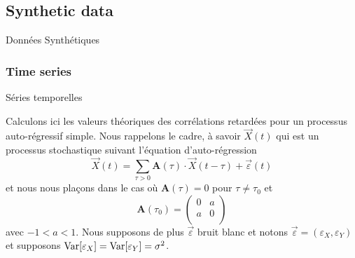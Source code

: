 








\subsection{Synthetic data}{Données Synthétiques}


\subsubsection{Time series}{Séries temporelles}


Calculons ici les valeurs théoriques des corrélations retardées pour un processus auto-régressif simple. Nous rappelons le cadre, à savoir $\vec{X}(t)$ qui est un processus stochastique suivant l'équation d'auto-régression
\[
\vec{X}(t) = \sum_{\tau > 0} \mathbf{A}(\tau) \cdot \vec{X}(t - \tau ) + \vec{\varepsilon}(t)
\]
et nous nous plaçons dans le cas où $\mathbf{A}(\tau) = 0$ pour $\tau \neq \tau_0$ et 
\[
\mathbf{A}(\tau_0) = \left( {\begin{array}{cc} 0 & a \\ a & 0 \\ \end{array}} \right)\]
avec $-1<a<1$. Nous supposons de plus $\vec{\varepsilon}$ bruit blanc et notons $\vec{\varepsilon} = (\varepsilon_X,\varepsilon_Y)$ et supposons $\operatorname{Var}\!\left[\varepsilon_X\right] = \operatorname{Var}\!\left[\varepsilon_Y\right] = \sigma^2$.

